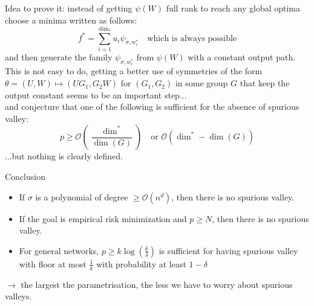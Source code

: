 \documentclass{beamer}
\begin{document}
\begin{frame}
	Idea to prove it: instead of getting $\psi(W)$ full rank to reach any global optima\\
	choose a minima written as follows:
	\begin{equation*}
		f^* = \sum_{i=1}^{\dim_*} u_i \psi_{\sigma, w^*_i} \quad\text{which is always possible}
	\end{equation*}
	and then generate the family $\psi_{\sigma, w^*_i}$ from $\psi(W)$ with a constant output path.\\
	This is not easy to do, getting a better use of symmetries of the form $\theta=(U,W) \mapsto (UG_1, G_2W)$ for $(G_1,G_2)$ in some group $G$ that keep the output constant seems to be an important step...\\
	and conjecture that one of the following is sufficient for the absence of spurious valley:
	\begin{equation*}
		p\geq \mathcal{O}\left(\frac{\dim^*}{\dim(G)}\right)\quad\text{or  }\mathcal{O}\left(\dim^* - \dim(G)\right)
	\end{equation*}
	...but nothing is clearly defined.
\end{frame}

\begin{frame}{Conclusion}
	\begin{itemize}
		\item If $\sigma$ is a polynomial of degree $\geq \mathcal{O}(n^d)$, then there is no spurious valley.
		\item If the goal is empirical risk minimization and $p\geq N$, then there is no spurious valley.
		\item For general networks, $p\geq k\log(\frac{k}{\delta})$ is sufficient for having spurious valley with floor at most $\frac{1}{k}$ with probability at least $1-\delta$ 
	\end{itemize}
	$\longrightarrow$ the largest the parametrisation, the less we have to worry about spurious valleys.\\

\end{frame}
\end{document}
